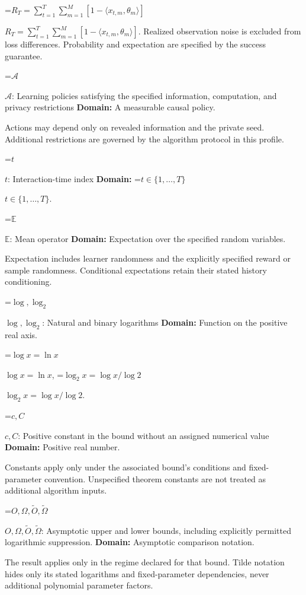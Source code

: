 \documentclass[10pt,a4paper]{article}
\newcommand{\AtlasMath}[1]{\par\begingroup\centering\setbox0=\hbox{$\displaystyle #1$}\ifdim\wd0>1.4\linewidth\typeout{ATLAS WIDE FORMULA: \the\wd0}\fi\ifdim\wd0>\linewidth\resizebox{\linewidth}{!}{\box0}\else\box0\fi\par\endgroup}
\newcommand{\AtlasInlineMath}[1]{\begingroup\setbox0=\hbox{$#1$}\ifdim\wd0>.4\linewidth\endgroup\AtlasMath{#1}\else\endgroup$#1$\fi}
\begin{document}
\AtlasInlineMath{R_T=\sum_{t=1}^T\sum_{m=1}^M[1-\langle x_{t,m},\theta_m\rangle]}. Realized observation noise is excluded from loss differences. Probability and expectation are specified by the success guarantee.



\AtlasInlineMath{\mathcal A}: Learning policies satisfying the specified information, computation, and privacy restrictions \textbf{Domain:} A measurable causal policy.



Actions may depend only on revealed information and the private seed. Additional restrictions are governed by the algorithm protocol in this profile.



\AtlasInlineMath{t}: Interaction-time index \textbf{Domain:} \AtlasInlineMath{t\in\{1,\ldots,T\}}.



\AtlasInlineMath{\mathbb E}: Mean operator \textbf{Domain:} Expectation over the specified random variables.



Expectation includes learner randomness and the explicitly specified reward or sample randomness. Conditional expectations retain their stated history conditioning.



\AtlasInlineMath{\log,\log_2}: Natural and binary logarithms \textbf{Domain:} Function on the positive real axis.



\AtlasInlineMath{\log x=\ln x}, \AtlasInlineMath{\log_2x=\log x/\log2}.



\AtlasInlineMath{c,C}: Positive constant in the bound without an assigned numerical value \textbf{Domain:} Positive real number.



Constants apply only under the associated bound’s conditions and fixed-parameter convention. Unspecified theorem constants are not treated as additional algorithm inputs.



\AtlasInlineMath{O,\Omega,\widetilde O,\widetilde\Omega}: Asymptotic upper and lower bounds, including explicitly permitted logarithmic suppression. \textbf{Domain:} Asymptotic comparison notation.



The result applies only in the regime declared for that bound. Tilde notation hides only its stated logarithms and fixed-parameter dependencies, never additional polynomial parameter factors.
\end{document}
